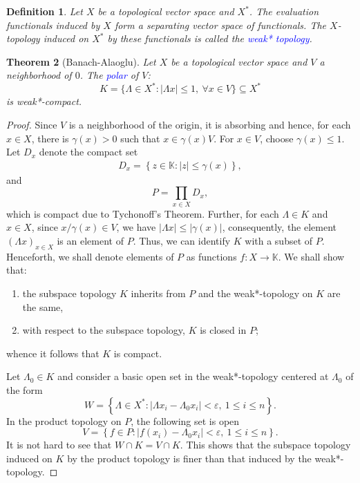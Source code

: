 \documentclass[12pt]{article}
\theoremstyle{thmstyle}
\newtheorem{theorem}{Theorem}[section]
\theoremstyle{defstyle}
\newtheorem{definition}[theorem]{Definition}
\newcommand{\R}{\mathbb{R}}
\newcommand{\bbC}{\mathbb{C}}
\newcommand{\K}{\mathbb{K}} %
\newcommand{\define}[1]{\textcolor{blue}{\textit{#1}}}
\renewcommand{\le}{\leqslant}
\begin{document}
\begin{definition}
    Let $X$ be a topological vector space and $X^\ast$. The evaluation functionals induced by $X$ form a separating vector space of functionals. The $X$-topology induced on $X^\ast$ by these functionals is called the \define{weak* topology}.
\end{definition}

\begin{theorem}[Banach-Alaoglu]
    Let $X$ be a topological vector space and $V$ a neighborhood of $0$. The \define{polar} of $V$: 
    \begin{equation*}
        K = \{\Lambda\in X^\ast\colon |\Lambda x|\le 1,~\forall x\in V\}\subseteq X^\ast
    \end{equation*}
    is weak*-compact.
\end{theorem}
\begin{proof}
    Since $V$ is a neighborhood of the origin, it is absorbing and hence, for each $x\in X$, there is $\gamma(x) > 0$ such that $x\in\gamma(x) V$. For $x\in V$, choose $\gamma(x)\le 1$. Let $D_x$ denote the compact set 
    \begin{align}
        D_x = \left\{z\in\K\colon |z|\le \gamma(x)\right\},
    \end{align}
    and 
    \begin{equation*}
        P = \prod_{x\in X}D_x,
    \end{equation*}
    which is compact due to Tychonoff's Theorem. Further, for each $\Lambda\in K$ and $x\in X$, since $x/\gamma(x)\in V$, we have $|\Lambda x|\le |\gamma(x)|$, consequently, the element $(\Lambda x)_{x\in X}$ is an element of $P$. Thus, we can identify $K$ with a subset of $P$. Henceforth, we shall denote elements of $P$ as functions $f: X\to\K$. We shall show that:
    \begin{enumerate}[label=(\roman*)]
        \item the subspace topology $K$ inherits from $P$ and the weak*-topology on $K$ are the same,
        \item with respect to the subspace topology, $K$ is closed in $P$;
    \end{enumerate}
    whence it follows that $K$ is compact.

    Let $\Lambda_0\in K$ and consider a basic open set in the weak*-topology centered at $\Lambda_0$ of the form 
    \begin{equation*}
        W = \left\{\Lambda\in X^\ast\colon |\Lambda x_i - \Lambda_0 x_i| < \varepsilon,~1\le i\le n\right\}.
    \end{equation*}
    In the product topology on $P$, the following set is open 
    \begin{equation*}
        V = \left\{f\in P\colon |f(x_i) - \Lambda_0 x_i| < \varepsilon,~1\le i\le n\right\}.
    \end{equation*}
    It is not hard to see that $W\cap K = V\cap K$. This shows that the subspace topology induced on $K$ by the product topology is finer than that induced by the weak*-topology.


\end{proof}
\end{document}
